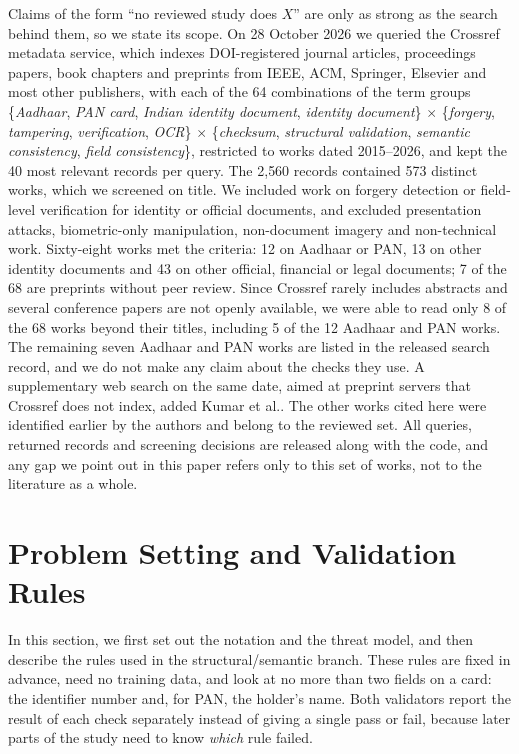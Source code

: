 \documentclass[VANCOUVER,Times1COL]{WileyNJDv5}
\begin{document}
Claims of the form ``no reviewed study does $X$'' are only as strong as
the search behind them, so we state its scope. On 28 October 2026 we
queried the Crossref metadata service, which indexes DOI-registered
journal articles, proceedings papers, book chapters and preprints from
IEEE, ACM, Springer, Elsevier and most other publishers, with each of
the 64 combinations of the term groups \{\emph{Aadhaar}, \emph{PAN
card}, \emph{Indian identity document}, \emph{identity document}\}
$\times$ \{\emph{forgery}, \emph{tampering}, \emph{verification},
\emph{OCR}\} $\times$ \{\emph{checksum}, \emph{structural validation},
\emph{semantic consistency}, \emph{field consistency}\}, restricted to
works dated 2015--2026, and kept the 40 most relevant records per
query. The 2{,}560 records contained 573 distinct works, which we
screened on title. We included work on forgery detection or field-level
verification for identity or official documents, and excluded
presentation attacks, biometric-only manipulation, non-document imagery
and non-technical work. Sixty-eight works met the criteria: 12 on
Aadhaar or PAN, 13 on other identity documents and 43 on other official,
financial or legal documents; 7 of the 68 are preprints without peer
review. Since Crossref rarely includes abstracts and several conference papers are not openly available, we were able to read only 8 of the 68 works beyond their titles, including 5 of the 12 Aadhaar and PAN works. The remaining seven Aadhaar and PAN works are listed in the released search record, and we do not make any claim about the checks they use. A supplementary web search on the same date, aimed at
preprint servers that Crossref does not index, added
Kumar et al.\cite{flid}. The other works cited here were identified
earlier by the authors and belong to the reviewed set. All queries, returned records and screening decisions are released along with the code, and any gap we point out in this paper refers only to this set of works, not to the literature as a whole.

\section{Problem Setting and Validation Rules}
\label{sec:framework}

In this section, we first set out the notation and the threat model, and then describe the rules used in the structural/semantic branch. These rules are fixed in advance, need no training data, and look at no more than two fields on a card: the identifier number and, for PAN, the holder's name. Both validators report the result of each check separately instead of giving a single pass or fail, because later parts of the study need to know \emph{which} rule failed.
\end{document}
